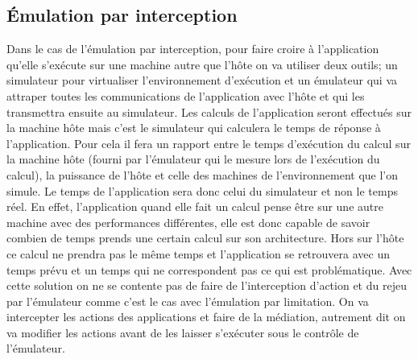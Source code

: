 \subsection{Émulation par interception}

Dans le cas de l'émulation par interception, pour faire croire à l'application
qu'elle s'exécute sur une machine autre que l'hôte on va utiliser deux outils;
un simulateur pour virtualiser l'environnement d'exécution et un émulateur qui
va attraper toutes les communications de l'application avec l'hôte et qui les
transmettra ensuite au simulateur. Les calculs de l'application seront effectués
sur la machine hôte mais c'est le simulateur qui calculera le temps de réponse à
l'application. Pour cela il fera un rapport entre le temps d'exécution du calcul
sur la machine hôte (fourni par l'émulateur qui le mesure lors de l'exécution du
calcul), la puissance de l'hôte et celle des machines de l'environnement que
l'on simule. Le temps de l'application sera donc celui du simulateur et non le
temps réel. En effet, l'application quand elle fait un calcul pense être sur une
autre machine avec des performances différentes, elle est donc capable de savoir
combien de temps prends une certain calcul sur son architecture. Hors sur l'hôte
ce calcul ne prendra pas le même temps et l'application se retrouvera avec un
temps prévu et un temps qui ne correspondent pas ce qui est problématique.  Avec
cette solution on ne se contente pas de faire de l'interception d'action et du
rejeu par l'émulateur comme c'est le cas avec l'émulation par limitation. On va
intercepter les actions des applications et faire de la médiation, autrement dit
on va modifier les actions avant de les laisser s'exécuter sous le contrôle de
l'émulateur.

